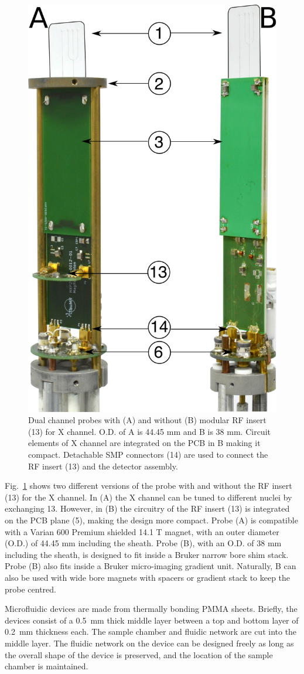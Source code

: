 \documentclass[preprint,5p]{elsarticle}
\newcommand{\fig}[1]{Fig.~\ref{#1}}
\begin{document}
\begin{figure}
\centering
\includegraphics[width=.5\linewidth,keepaspectratio=true]{./figures/ms5n17-tlp-im-181007-both-detectors.png}
\caption{Dual channel probes with (A) and without (B) modular RF insert (13) for X channel. 
O.D. of A is 44.45 mm and B is 38 mm. Circuit elements of X channel are integrated on the 
PCB in B making it compact. Detachable SMP connectors (14) are used to 
connect the RF insert (13) and the detector assembly.}
\label{fig:ProbePhoto}
\end{figure}
\fig{fig:ProbePhoto} shows two different versions of the probe with and without the RF insert (13) 
for the X channel. In (A) the X channel can be tuned to different nuclei by exchanging 13. 
However, in (B) the circuitry of the RF insert (13) is integrated on the PCB plane (5), 
making the design more compact.
 Probe (A) is compatible with a Varian 600 Premium shielded 14.1 T magnet, with an outer diameter (O.D.) of 44.45 mm including the sheath. Probe (B), with an 
O.D. of 38 mm including the sheath, is designed to fit inside a 
Bruker narrow bore shim stack. 
Probe (B) also fits inside a Bruker micro-imaging gradient unit. Naturally, B can also be used with 
wide bore magnets with spacers or gradient stack to keep the probe centred.

Microfluidic devices are made from thermally bonding PMMA sheets.
Briefly, the devices consist of a 0.5~mm thick middle layer between a top and bottom layer of 
0.2~mm thickness each. The sample chamber and fluidic network are cut into the middle layer.
The fluidic network on the device can be designed freely as long as the overall shape of the
device is preserved, and the location of the sample chamber is maintained.
\end{document}
